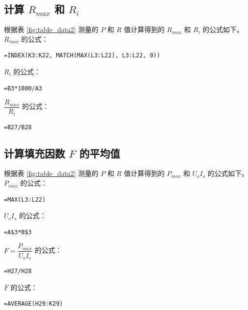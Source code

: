 \documentclass[12pt]{article}
\begin{document}
\subsection{\normalfont 计算 $R_{max}$ 和 $R_i$}

根据表 \ref{fig:table_data2} 测量的 $P$ 和 $R$ 值计算得到的 $R_{max}$ 和 $R_i$ 的公式如下。
\newline \newline $R_{max}$ 的公式：
\begin{Verbatim}[frame=single, fontsize=\small]
    =INDEX(K3:K22, MATCH(MAX(L3:L22), L3:L22, 0))
\end{Verbatim}
$R_i$ 的公式：
\begin{Verbatim}[frame=single, fontsize=\small]
    =B3*1000/A3
\end{Verbatim}
$\dfrac{R_{max}}{R_i}$ 的公式：
\begin{Verbatim}[frame=single, fontsize=\small]
    =B27/B28
\end{Verbatim}


\subsection{\normalfont 计算填充因数 $F$ 的平均值}

根据表 \ref{fig:table_data2} 测量的 $P$ 和 $R$ 值计算得到的 $P_{max}$ 和 $U_{o}I_{s}$ 的公式如下。
\newline \newline $P_{max}$ 的公式：
\begin{Verbatim}[frame=single, fontsize=\small]
    =MAX(L3:L22)
\end{Verbatim}
$U_{o}I_{s}$ 的公式：
\begin{Verbatim}[frame=single, fontsize=\small]
    =A$3*B$3
\end{Verbatim}
$F=\dfrac{P_{max}}{U_{o}I_{s}}$ 的公式：
\begin{Verbatim}[frame=single, fontsize=\small]
    =H27/H28
\end{Verbatim}
$\overline F$ 的公式：
\begin{Verbatim}[frame=single, fontsize=\small]
    =AVERAGE(H29:K29)
\end{Verbatim}
\end{document}
